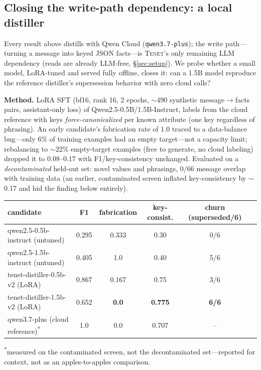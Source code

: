 \documentclass[11pt]{article}
\newcommand{\tenet}{\textsc{Tenet}}
\begin{document}
\subsection{Closing the write-path dependency: a local distiller}\label{sec:localdistill}
Every result above distills with Qwen Cloud (\texttt{qwen3.7-plus}); the write path---turning
a message into keyed JSON facts---is \tenet{}'s only remaining LLM dependency (reads are
already LLM-free, \S\ref{sec:setup}). We probe whether a small model, LoRA-tuned and served
fully offline, closes it: can a 1.5B model reproduce the reference distiller's supersession
behavior with zero cloud calls?

\textbf{Method.} LoRA SFT (bf16, rank 16, 2 epochs, $\sim$490 synthetic message$\to$facts
pairs, assistant-only loss) of Qwen2.5-0.5B/1.5B-Instruct, labels from the cloud reference
with keys \emph{force-canonicalized} per known attribute (one key regardless of phrasing).
An early candidate's fabrication rate of $1.0$ traced to a data-balance bug---only 6\% of
training examples had an empty target---not a capacity limit; rebalancing to $\sim$22\%
empty-target examples (free to generate, no cloud labeling) dropped it to $0.08$--$0.17$ with
F1/key-consistency unchanged. Evaluated on a \emph{decontaminated} held-out set: novel values
and phrasings, 0/66 message overlap with training data (an earlier, contaminated screen
inflated key-consistency by $\sim$0.17 and hid the finding below entirely).

\begin{center}
\begin{tabular}{lccccc}
\toprule
candidate & F1 & fabrication & key-consist. & churn (superseded/6)\\
\midrule
qwen2.5-0.5b-instruct (untuned) & 0.295 & 0.333 & 0.30 & 0/6\\
qwen2.5-1.5b-instruct (untuned) & 0.405 & 1.0 & 0.40 & 5/6\\
tenet-distiller-0.5b-v2 (LoRA) & 0.867 & 0.167 & 0.75 & 3/6\\
tenet-distiller-1.5b-v2 (LoRA) & 0.652 & \textbf{0.0} & \textbf{0.775} & \textbf{6/6}\\
\midrule
qwen3.7-plus (cloud reference)\textsuperscript{*} & 1.0 & 0.0 & 0.707 & --\\
\bottomrule
\end{tabular}
\end{center}
{\footnotesize\textsuperscript{*}measured on the contaminated screen, not the decontaminated
set---reported for context, not as an apples-to-apples comparison.}
\end{document}

